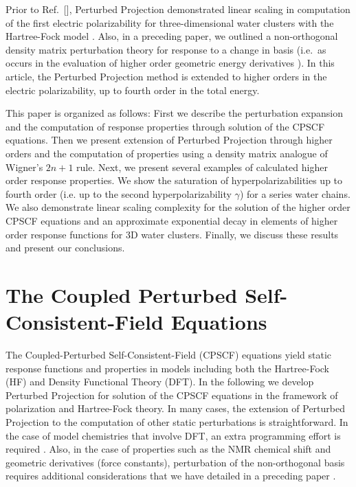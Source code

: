 \documentclass[prl,aps,preprint,showpacs,superbib]{revtex4}
\begin{document}
Prior to Ref.~[], Perturbed Projection demonstrated linear scaling in 
computation of the first electric polarizability for three-dimensional water clusters with the 
Hartree-Fock model \cite{VWeber04}. Also, in a preceding paper, we outlined a non-orthogonal density matrix
perturbation theory \cite{ANiklasson05a} for response to a change in basis (i.e.~as occurs in 
the evaluation of higher order geometric energy derivatives \cite{RAmos89}). 
In this article, the Perturbed Projection method is extended to higher orders
in the electric polarizability, up to fourth order in the total energy.  

This paper is organized as follows: First we describe the perturbation expansion and 
the computation of response properties through solution of the CPSCF equations.
Then we present extension of Perturbed Projection through higher orders and the 
computation of properties using a density matrix analogue of Wigner's $2 n+1$ rule.
Next,  we present several examples of calculated higher order response properties.
We show the saturation of hyperpolarizabilities up to  fourth order (i.e. up to the 
second hyperpolarizability $\gamma$) for a series water chains.
We also  demonstrate linear scaling complexity for the solution of the higher order CPSCF
equations and an approximate exponential decay in elements of higher order response functions
for 3D water clusters.  Finally, we discuss these results and present our conclusions. 

\section{The Coupled Perturbed Self-Consistent-Field Equations}

The Coupled-Perturbed Self-Consistent-Field (CPSCF) equations yield
static response functions and properties in models including both the 
Hartree-Fock (HF) and Density Functional Theory (DFT).  In the following
we develop Perturbed Projection for solution of the CPSCF equations in the framework of polarization and 
Hartree-Fock theory.  In many cases, the extension of Perturbed Projection to
the computation of other static perturbations is straightforward.  In
the case of model chemistries that involve DFT, an extra programming effort is required \cite{Lee_1994,PSalek02}.
Also, in the case of properties such as the NMR chemical shift and geometric derivatives 
(force constants), perturbation of the non-orthogonal basis requires additional 
considerations that we have detailed in a preceding paper \cite{ANiklasson05a}.
\end{document}
